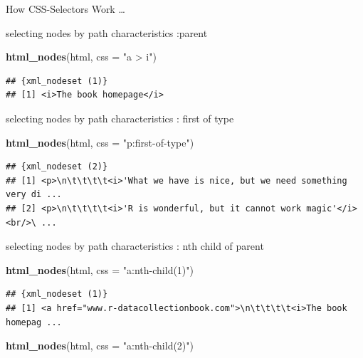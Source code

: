 \documentclass[ignorenonframetext,]{beamer}
\newenvironment{Shaded}{\begin{snugshade}}{\end{snugshade}}
\newcommand{\KeywordTok}[1]{\textcolor[rgb]{0.13,0.29,0.53}{\textbf{{#1}}}}
\newcommand{\DataTypeTok}[1]{\textcolor[rgb]{0.13,0.29,0.53}{{#1}}}
\newcommand{\StringTok}[1]{\textcolor[rgb]{0.31,0.60,0.02}{{#1}}}
\newcommand{\NormalTok}[1]{{#1}}
\begin{document}
\begin{frame}[fragile]{How CSS-Selectors Work \ldots{}}
\begin{block}{selecting nodes by path characteristics :parent}
\begin{Shaded}
\begin{Highlighting}[]
\KeywordTok{html_nodes}\NormalTok{(html, }\DataTypeTok{css =} \StringTok{"a > i"}\NormalTok{)}
\end{Highlighting}
\end{Shaded}

\begin{verbatim}
## {xml_nodeset (1)}
## [1] <i>The book homepage</i>
\end{verbatim}

\end{block}

\begin{block}{selecting nodes by path characteristics : first of type}

\begin{Shaded}
\begin{Highlighting}[]
\KeywordTok{html_nodes}\NormalTok{(html, }\DataTypeTok{css =} \StringTok{"p:first-of-type"}\NormalTok{)}
\end{Highlighting}
\end{Shaded}

\begin{verbatim}
## {xml_nodeset (2)}
## [1] <p>\n\t\t\t\t<i>'What we have is nice, but we need something very di ...
## [2] <p>\n\t\t\t\t<i>'R is wonderful, but it cannot work magic'</i><br/>\ ...
\end{verbatim}

\end{block}

\begin{block}{selecting nodes by path characteristics : nth child of
parent}

\begin{Shaded}
\begin{Highlighting}[]
\KeywordTok{html_nodes}\NormalTok{(html, }\DataTypeTok{css =} \StringTok{"a:nth-child(1)"}\NormalTok{)}
\end{Highlighting}
\end{Shaded}

\begin{verbatim}
## {xml_nodeset (1)}
## [1] <a href="www.r-datacollectionbook.com">\n\t\t\t\t<i>The book homepag ...
\end{verbatim}

\begin{Shaded}
\begin{Highlighting}[]
\KeywordTok{html_nodes}\NormalTok{(html, }\DataTypeTok{css =} \StringTok{"a:nth-child(2)"}\NormalTok{)}
\end{Highlighting}
\end{Shaded}


\end{block}
\end{frame}
\end{document}
